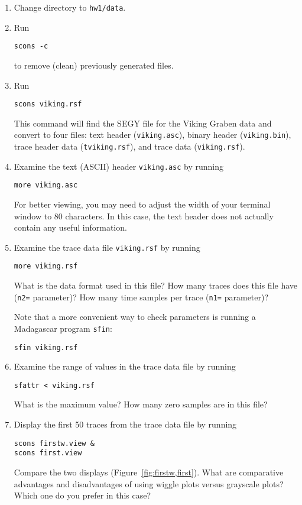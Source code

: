 \begin{enumerate}          
\item Change directory to \texttt{hw1/data}.
\item Run
\begin{verbatim}
scons -c
\end{verbatim}
to remove (clean) previously generated files.
\item Run
\begin{verbatim}
scons viking.rsf
\end{verbatim}
This command will find the SEGY file for the Viking Graben data and convert to four files: text header (\texttt{viking.asc}), binary header (\texttt{viking.bin}), trace header data (\texttt{tviking.rsf}), and trace data (\texttt{viking.rsf}).
\item Examine the text (ASCII) header \texttt{viking.asc} by running
\begin{verbatim}
more viking.asc
\end{verbatim}
For better viewing, you may need to adjust the width of your terminal window to 80 characters. In this case, the text header does not actually contain any useful information.
\item Examine the trace data file \texttt{viking.rsf} by running
\begin{verbatim}
more viking.rsf
\end{verbatim}
What is the data format used in this file? How many traces does this file have (\texttt{n2=} parameter)? How many time samples per trace (\texttt{n1=} parameter)?

\answer{

}       

Note that a more convenient way to check parameters is running a Madagascar program \texttt{sfin}:
\begin{verbatim}
sfin viking.rsf
\end{verbatim}
\item Examine the range of values in the trace data file by running
\begin{verbatim}
sfattr < viking.rsf
\end{verbatim}
What is the maximum value? How many zero samples are in this file?

\answer{

}

\item Display the first 50 traces from the trace data file by running
\begin{verbatim}
scons firstw.view &
scons first.view 
\end{verbatim}
Compare the two displays (Figure~\ref{fig:firstw,first}). What are
comparative advantages and disadvantages of using wiggle plots versus
grayscale plots? Which one do you prefer in this case?


\end{enumerate}

